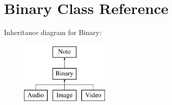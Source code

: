 \hypertarget{classBinary}{\section{\-Binary \-Class \-Reference}
\label{classBinary}
}
\-Inheritance diagram for \-Binary\-:\begin{figure}[H]
\begin{center}
\leavevmode
\includegraphics[height=3.000000cm]{classBinary}
\end{center}
\end{figure}
